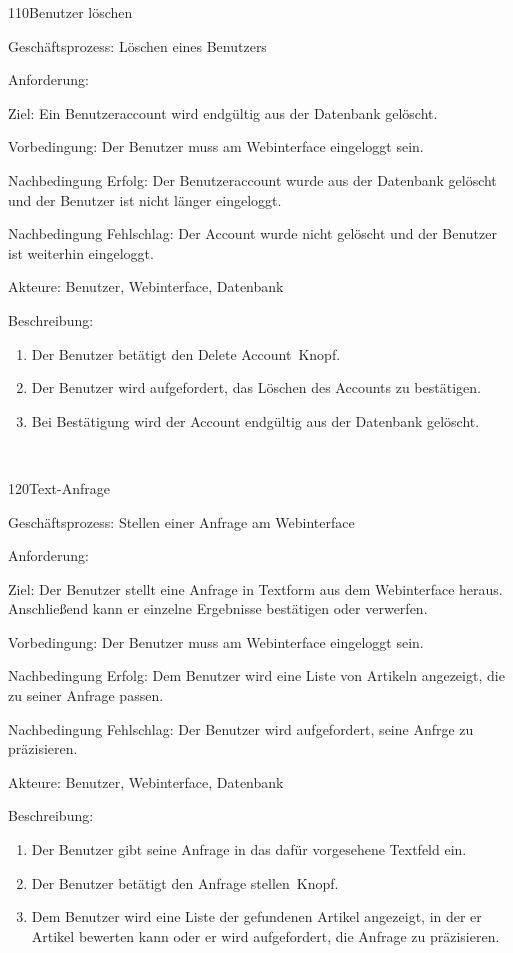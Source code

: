 \begin{function}{110}{Benutzer löschen}
\item[Geschäftsprozess:] Löschen eines Benutzers
\item[Anforderung:] 
\item[Ziel:] Ein Benutzeraccount wird endgültig aus der Datenbank gelöscht.
\item[Vorbedingung:] Der Benutzer muss am Webinterface eingeloggt sein.
\item[Nachbedingung Erfolg:] Der Benutzeraccount wurde aus der Datenbank gelöscht und der Benutzer ist nicht länger eingeloggt.
\item[Nachbedingung Fehlschlag:] Der Account wurde nicht gelöscht und der Benutzer ist weiterhin eingeloggt.
\item[Akteure:] Benutzer, Webinterface, Datenbank
\item[Beschreibung:] ~
\begin{enumerate}
\item Der Benutzer betätigt den \glqq Delete Account\grqq\ Knopf.
\item Der Benutzer wird aufgefordert, das Löschen des Accounts zu bestätigen.
\item Bei Bestätigung wird der Account endgültig aus der Datenbank gelöscht.
\end{enumerate}
\end{function} ~

\begin{function}{120}{Text-Anfrage}
\item[Geschäftsprozess:] Stellen einer Anfrage am Webinterface
\item[Anforderung:] 
\item[Ziel:] Der Benutzer stellt eine Anfrage in Textform aus dem Webinterface heraus. Anschließend kann er einzelne Ergebnisse bestätigen oder verwerfen.
\item[Vorbedingung:] Der Benutzer muss am Webinterface eingeloggt sein.
\item[Nachbedingung Erfolg:] Dem Benutzer wird eine Liste von Artikeln angezeigt, die zu seiner Anfrage passen.
\item[Nachbedingung Fehlschlag:] Der Benutzer wird aufgefordert, seine Anfrge zu präzisieren.
\item[Akteure:] Benutzer, Webinterface, Datenbank
\item[Beschreibung:] ~
\begin{enumerate}
\item Der Benutzer gibt seine Anfrage in das dafür vorgesehene Textfeld ein.
\item Der Benutzer betätigt den \glqq Anfrage stellen\grqq~Knopf.
\item Dem Benutzer wird eine Liste der gefundenen Artikel angezeigt, in der er Artikel bewerten kann oder er wird aufgefordert, die Anfrage zu präzisieren.
\end{enumerate}
\end{function} ~
